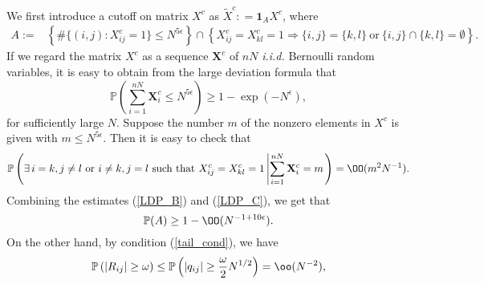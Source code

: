 We first introduce a cutoff on matrix $X^c$ as $\tilde X^c : =\mathbf{1}_{A}X^c$, where
\begin{align*}
A:=& \left\{\#\{(i,j):X^c_{ij}=1\}\leq N^{5\epsilon}\right\} \cap \left\{X^c_{ij}=X^c_{kl}=1  {\Rightarrow} \{i,j\}=\{k,l\} \ \text{or} \  \{i,j\} \cap \{k,l\}=\emptyset \right\}.
\end{align*}
If we regard the matrix $X^c$ as a sequence $\mathbf X^c$ of $nN$ {\it{i.i.d.}} Bernoulli random variables, it is easy to obtain from the large deviation formula that
\begin{equation}\label{LDP_B}
\mathbb{P}\left(\sum_{i=1}^{nN} \mathbf X^c_i \leq N^{5 \epsilon}\right) \geq 1- \exp(- N^{\epsilon}),
\end{equation}
for sufficiently large $N$. Suppose the number $m$ of the nonzero elements in $X^c$ is given with $m \le N^{5\epsilon} $. Then it is easy to check that
\begin{align}\label{LDP_C}
\mathbb P\left(\exists \, i = k, j\ne l \ \text{or} \  i\ne k, j =l \text{ such that } X^c_{ij}=X^c_{kl}=1 \left| \sum_{i=1}^{nN} \mathbf X^c_i = m \right. \right) = \OO(m^2N^{-1}). 
\end{align}
Combining the estimates (\ref{LDP_B}) and (\ref{LDP_C}), we get that 
\begin{equation}\label{prob_A}
\mathbb P(A) \ge 1 -  \OO(N^{-1+10\epsilon}).
\end{equation}
On the other hand, by condition (\ref{tail_cond}), we have
\begin{equation}\label{prob_R}
\mathbb{P}\left(|R_{ij}| \geq \omega \right) \leq \mathbb{P}\left(|q_{ij}| \geq \frac{\omega}{2}N^{1/2}\right) = \oo(N^{-2}) ,
\end{equation}
